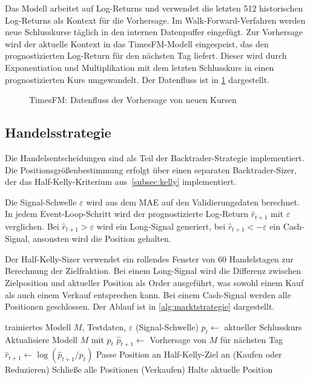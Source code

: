 Das Modell arbeitet auf Log-Returns und verwendet die letzten 512 historischen Log-Returns als Kontext für die Vorhersage. Im Walk-Forward-Verfahren werden neue Schlusskurse täglich in den internen Datenpuffer eingefügt. Zur Vorhersage wird der aktuelle Kontext in das TimesFM-Modell eingespeist, das den prognostizierten Log-Return für den nächsten Tag liefert. Dieser wird durch Exponentiation und Multiplikation mit dem letzten Schlusskurs in einen prognostizierten Kurs umgewandelt. Der Datenfluss ist in \cref{fig:timesfm_datenfluss} dargestellt.
\begin{figure}[H]
    \centering
    
    \caption{TimesFM: Datenfluss der Vorhersage von neuen Kursen}\label{fig:timesfm_datenfluss}
\end{figure}

\subsection{Handelsstrategie}\label{subsec:impl_marktstrategie}
Die Handelsentscheidungen sind als Teil der Backtrader-Strategie implementiert. Die Positionsgrößenbestimmung erfolgt über einen separaten Backtrader-Sizer, der das Half-Kelly-Kriterium aus~\cref{subsec:kelly} implementiert.

Die Signal-Schwelle $\varepsilon$ wird aus dem \ac{MAE} auf den Validierungsdaten berechnet. In jedem Event-Loop-Schritt wird der prognostizierte Log-Return $\hat{r}_{t+1}$ mit $\varepsilon$ verglichen. Bei $\hat{r}_{t+1} > \varepsilon$ wird ein Long-Signal generiert, bei $\hat{r}_{t+1} < -\varepsilon$ ein Cash-Signal, ansonsten wird die Position gehalten.

Der Half-Kelly-Sizer verwendet ein rollendes Fenster von 60 Handelstagen zur Berechnung der Zielfraktion. Bei einem Long-Signal wird die Differenz zwischen Zielposition und aktueller Position als Order ausgeführt, was sowohl einem Kauf als auch einem Verkauf entsprechen kann. Bei einem Cash-Signal werden alle Positionen geschlossen. Der Ablauf ist in \cref{alg:marktstrategie} dargestellt.
\begin{algorithm}
    \caption{PredictionStrategy -- Handelsstrategie}\label{alg:marktstrategie}
    \small
    \begin{algorithmic}[1]
        \Require trainiertes Modell $M$, Testdaten, $\varepsilon$ (Signal-Schwelle)
        \State $p_t \gets$ aktueller Schlusskurs
        \State Aktualisiere Modell $M$ mit $p_t$
        \State $\hat{p}_{t+1} \gets$ Vorhersage von $M$ für nächsten Tag
        \State $\hat{r}_{t+1} \gets \log(\hat{p}_{t+1} / p_t)$
        \State Passe Position an Half-Kelly-Ziel an (Kaufen oder Reduzieren)
        \State Schließe alle Positionen (Verkaufen)
        \Else
        \State Halte aktuelle Position
        \EndIf
        \EndFor
    \end{algorithmic}
\end{algorithm}